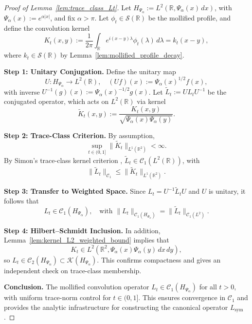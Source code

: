 \begin{proof}[Proof of Lemma~\ref{lem:trace_class_Lt}]
Let \( H_{\Psi_\alpha} := L^2(\mathbb{R}, \Psi_\alpha(x)\, dx) \), with \( \Psi_\alpha(x) := e^{\alpha |x|} \), and fix \( \alpha > \pi \). Let \( \phi_t \in \mathcal{S}(\mathbb{R}) \) be the mollified profile, and define the convolution kernel
\[
K_t(x,y) := \frac{1}{2\pi} \int_{\mathbb{R}} e^{i(x - y)\lambda} \phi_t(\lambda)\, d\lambda = k_t(x - y),
\]
where \( k_t \in \mathcal{S}(\mathbb{R}) \) by Lemma~\ref{lem:mollified_profile_decay}.

\medskip
\noindent\textbf{Step 1: Unitary Conjugation.}
Define the unitary map
\[
U \colon H_{\Psi_\alpha} \to L^2(\mathbb{R}), \quad (Uf)(x) := \Psi_\alpha(x)^{1/2} f(x),
\]
with inverse \( U^{-1}(g)(x) := \Psi_\alpha(x)^{-1/2} g(x) \). Let \( \widetilde{L}_t := U L_t U^{-1} \) be the conjugated operator, which acts on \( L^2(\mathbb{R}) \) via kernel
\[
\widetilde{K}_t(x,y) := \frac{K_t(x,y)}{\sqrt{\Psi_\alpha(x)\Psi_\alpha(y)}}.
\]

\medskip
\noindent\textbf{Step 2: Trace-Class Criterion.}
By assumption,
\[
\sup_{t \in (0,1]} \| \widetilde{K}_t \|_{L^1(\mathbb{R}^2)} < \infty.
\]
By Simon’s trace-class kernel criterion \cite[Thm.~4.2]{Simon2005TraceIdeals}, \( \widetilde{L}_t \in \mathcal{C}_1(L^2(\mathbb{R})) \), with
\[
\| \widetilde{L}_t \|_{\mathcal{C}_1} \le \| \widetilde{K}_t \|_{L^1(\mathbb{R}^2)}.
\]

\medskip
\noindent\textbf{Step 3: Transfer to Weighted Space.}
Since \( L_t = U^{-1} \widetilde{L}_t U \) and \( U \) is unitary, it follows that
\[
L_t \in \mathcal{C}_1(H_{\Psi_\alpha}), \quad \text{with } \| L_t \|_{\mathcal{C}_1(H_{\Psi_\alpha})} = \| \widetilde{L}_t \|_{\mathcal{C}_1(L^2)}.
\]

\medskip
\noindent\textbf{Step 4: Hilbert–Schmidt Inclusion.}
In addition, Lemma~\ref{lem:kernel_L2_weighted_bound} implies that
\[
K_t \in L^2(\mathbb{R}^2, \Psi_\alpha(x)\Psi_\alpha(y)\, dx\, dy),
\]
so \( L_t \in \mathcal{C}_2(H_{\Psi_\alpha}) \subset \mathcal{K}(H_{\Psi_\alpha}) \). This confirms compactness and gives an independent check on trace-class membership.

\medskip
\noindent\textbf{Conclusion.}
The mollified convolution operator \( L_t \in \mathcal{C}_1(H_{\Psi_\alpha}) \) for all \( t > 0 \), with uniform trace-norm control for \( t \in (0,1] \). This ensures convergence in \( \mathcal{C}_1 \) and provides the analytic infrastructure for constructing the canonical operator \( L_{\mathrm{sym}} \).
\end{proof}

